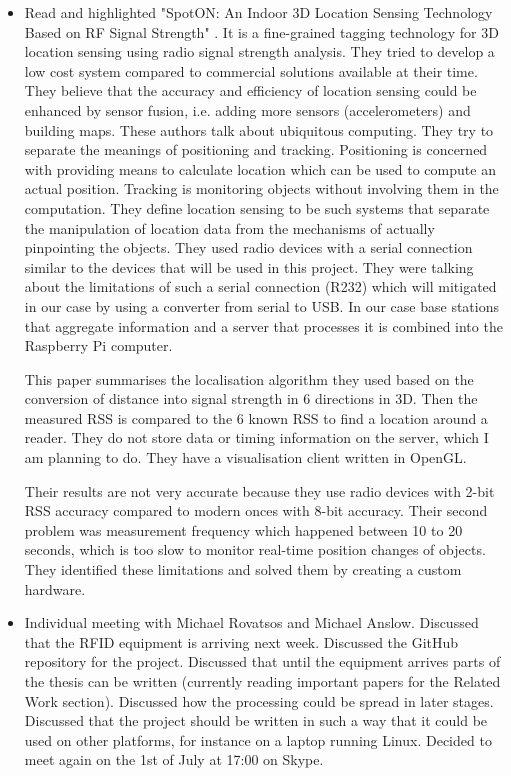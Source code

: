 \documentclass[a4paper,12pt]{article}
\begin{document}
\begin{itemize}
	\item Read and highlighted "SpotON: An Indoor 3D Location Sensing Technology Based on RF Signal Strength" \cite{Hightower2000}. It is a fine-grained tagging technology for 3D location sensing using radio signal strength analysis. They tried to develop a low cost system compared to commercial solutions available at their time. They believe that the accuracy and efficiency of location sensing could be enhanced by sensor fusion, i.e. adding more sensors (accelerometers) and building maps. These authors talk about ubiquitous computing. They try to separate the meanings of positioning and tracking. Positioning is concerned with providing means to calculate location which can be used to compute an actual position. Tracking is monitoring objects without involving them in the computation. They define location sensing to be such systems that separate the manipulation of location data from the mechanisms of actually pinpointing the objects. They used radio devices with a serial connection similar to the devices that will be used in this project. They were talking about the limitations of such a serial connection (R232) which will mitigated in our case by using a converter from serial to USB. In our case base stations that aggregate information and a server that processes it is combined into the Raspberry Pi computer. 
	
	This paper summarises the localisation algorithm they used based on the conversion of distance into signal strength in 6 directions in 3D. Then the measured RSS is compared to the 6 known RSS to find a location around a reader. They do not store data or timing information on the server, which I am planning to do. They have a visualisation client written in OpenGL. 
	
	Their results are not very accurate because they use radio devices with 2-bit RSS accuracy compared to modern onces with 8-bit accuracy. Their second problem was measurement frequency which happened between 10 to 20 seconds, which is too slow to monitor real-time position changes of objects. They identified these limitations and solved them by creating a custom hardware.
	
	\item Individual meeting with Michael Rovatsos and Michael Anslow. Discussed that the RFID equipment is arriving next week. Discussed the GitHub repository for the project. Discussed that until the equipment arrives parts of the thesis can be written (currently reading important papers for the Related Work section). Discussed how the processing could be spread in later stages. Discussed that the project should be written in such a way that it could be used on other platforms, for instance on a laptop running Linux. Decided to meet again on the 1st of July at 17:00 on Skype.
	
\end{itemize}
\end{document}
